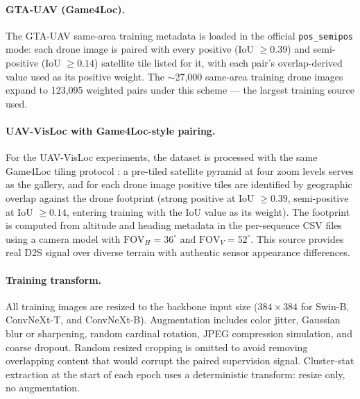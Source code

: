 \documentclass[conference]{IEEEtran}
\begin{document}
\paragraph{GTA-UAV (Game4Loc).}
The GTA-UAV same-area training metadata \cite{ji2024game4loc} is loaded in
the official \texttt{pos\_semipos} mode: each drone image is paired with
every positive (IoU $\geq 0.39$) and semi-positive (IoU $\geq 0.14$)
satellite tile listed for it, with each pair's overlap-derived value used
as its positive weight. The $\sim$27,000 same-area training drone images
expand to 123,095 weighted pairs under this scheme — the largest training
source used.

\paragraph{UAV-VisLoc with Game4Loc-style pairing.}
For the UAV-VisLoc experiments, the dataset \cite{xu2024uavvisloc} is
processed with the same Game4Loc tiling protocol \cite{ji2024game4loc}: a
pre-tiled satellite pyramid at four zoom levels serves as the gallery, and
for each drone image positive tiles are identified by geographic overlap
against the drone footprint (strong positive at IoU $\geq 0.39$,
semi-positive at IoU $\geq 0.14$, entering training with the IoU value as
its weight). The footprint is computed from altitude and heading metadata in
the per-sequence CSV files using a camera model with
$\text{FOV}_H = 36^\circ$ and $\text{FOV}_V = 52^\circ$. This source
provides real D2S signal over diverse terrain with authentic sensor
appearance differences.

\paragraph{Training transform.}
All training images are resized to the backbone input size ($384\times384$
for Swin-B, ConvNeXt-T, and ConvNeXt-B).
Augmentation includes color jitter, Gaussian blur or sharpening,
random cardinal rotation, JPEG compression simulation, and coarse dropout.
Random resized cropping is omitted to avoid removing overlapping content
that would corrupt the paired supervision signal.
Cluster-stat extraction at the start of each epoch uses a deterministic
transform: resize only, no augmentation.
\end{document}
